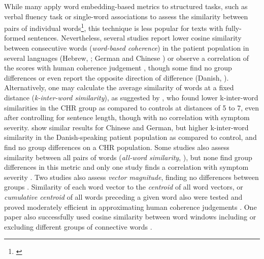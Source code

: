 While many apply word embedding-based metrics to structured tasks, such as verbal fluency task or single-word associations to assess the similarity between pairs of individual words\footnote{\cite{elvevaag2007quantifying, holmlund2019updating, pietrowicz2019new, ryazanskaya2020thesis, ryazanskaya2020automated, ku2021computational}}, this technique is less popular for texts with fully-formed sentences. Nevertheless, several studies report lower cosine similarity between consecutive words (\textit{word-based coherence}) in the patient population in several languages (Hebrew, \cite{bar2019semantic}; German and Chinese \cite{parola2022speech}) or observe a correlation of the scores with human coherence judgement \citep{xu2020centroid}, though some find no group differences \citep{liebenthal2022linguistic, argolo2023burnishing} or even report the opposite direction of difference (Danish, \cite{parola2022speech}). Alternatively, one may calculate the average similarity of words at a fixed distance (\textit{k-inter-word similarity}), as suggested by \citet{corcoran2018prediction}, who found lower k-inter-word similarities in the CHR group as compared to controls at distances of 5 to 7, even after controlling for sentence length, though with no correlation with symptom severity. \citet{parola2022speech} show similar results for Chinese and German, but higher k-inter-word similarity in the Danish-speaking patient population as compared to control, and \citet{argolo2023burnishing} find no group differences on a CHR population. Some studies also assess similarity between all pairs of words (\textit{all-word similarity}, \citet{alonso2022language, alonso2022progressive, liebenthal2022linguistic}), but none find group differences in this metric and only one study finds a correlation with symptom severity \citep{alonso2022progressive}. Two studies also assess \textit{vector magnitude}, finding no differences between groups \citep{rezaii2019machine, liebenthal2022linguistic}. Similarity of each word vector to the \textit{centroid} of all word vectors, or \textit{cumulative centroid} of all words preceding a given word also were tested and proved moderately efficient in approximating human coherence judgements \citep{xu2020centroid, xu2022fully}. One paper also successfully used cosine similarity between word windows including or excluding different groups of connective words \citep{corona2022assessing}.

